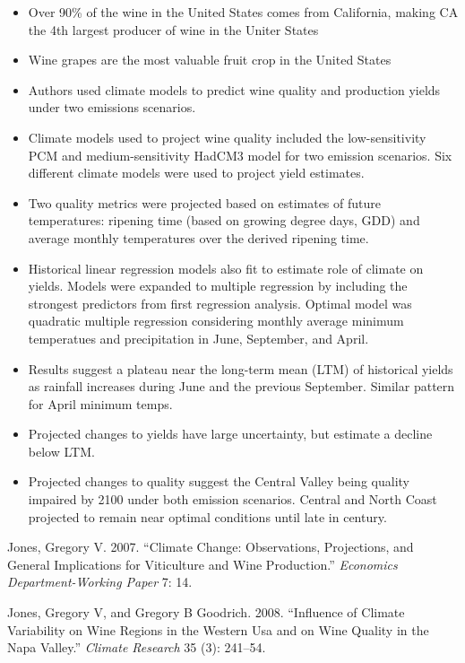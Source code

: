 \begin{itemize}
\tightlist
  \item
    Over 90\% of the wine in the United States comes from California, making CA the 4th largest producer of wine in the Uniter States
  \item
    Wine grapes are the most valuable fruit crop in the United States
  \item
    Authors used climate models to predict wine quality and production yields under two emissions scenarios. 
  \item
    Climate models used to project wine quality included the low-sensitivity PCM and medium-sensitivity HadCM3 model for two emission scenarios. Six different climate models were used to project yield estimates.
  \item
    Two quality metrics were projected based on estimates of future temperatures: ripening time (based on growing degree days, GDD) and average monthly temperatures over the derived ripening time.
  \item
    Historical linear regression models also fit to estimate role of climate on yields. Models were expanded to multiple regression by including the strongest predictors from first regression analysis. Optimal model was quadratic multiple regression considering monthly average minimum temperatues and precipitation in June, September, and April.
  \item
    Results suggest a plateau near the long-term mean (LTM) of historical yields as rainfall increases during June and the previous September. Similar pattern for April minimum temps.
  \item
    Projected changes to yields have large uncertainty, but estimate a decline below LTM.
  \item
    Projected changes to quality suggest the Central Valley being quality impaired by 2100 under both emission scenarios. Central and North Coast projected to remain near optimal conditions until late in century.
    
\end{itemize}

\hypertarget{ref-jones2007}{}
Jones, Gregory V. 2007. ``Climate Change: Observations, Projections, and
General Implications for Viticulture and Wine Production.''
\emph{Economics Department-Working Paper} 7: 14.

\hypertarget{ref-jones2008}{}
Jones, Gregory V, and Gregory B Goodrich. 2008. ``Influence of Climate
Variability on Wine Regions in the Western Usa and on Wine Quality in
the Napa Valley.'' \emph{Climate Research} 35 (3): 241--54.

